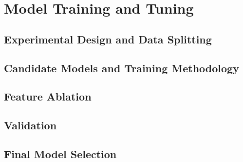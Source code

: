 \section{Model Training and Tuning}

\subsection{Experimental Design and Data Splitting}

\subsection{Candidate Models and Training Methodology}

\subsection{Feature Ablation}

\subsection{Validation}

\subsection{Final Model Selection}